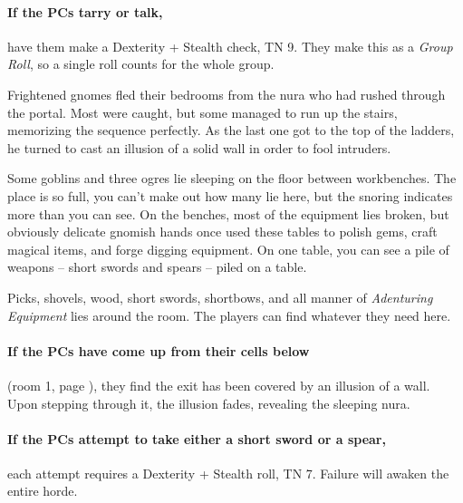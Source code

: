 \begin{multicols}{2}
\paragraph{If the PCs tarry or talk,}
have them make a Dexterity + Stealth check, TN 9.
They make this as a \textit{Group Roll}, so a single roll counts for the whole group.


\label{laddertop}

\begin{exampletext}

	Frightened gnomes fled their bedrooms from the nura who had rushed through the portal.
	Most were caught, but some managed to run up the stairs, memorizing the sequence perfectly.
	As the last one got to the top of the ladders, he turned to cast an illusion of a solid wall in order to fool intruders.

\end{exampletext}

\begin{boxtext}

	Some goblins and three ogres lie sleeping on the floor between workbenches.
	The place is so full, you can't make out how many lie here, but the snoring indicates more than you can see.
	On the benches, most of the equipment lies broken, but obviously delicate gnomish hands once used these tables to polish gems, craft magical items, and forge digging equipment.
	On one table, you can see a pile of weapons -- short swords and spears -- piled on a table.

\end{boxtext}

Picks, shovels, wood, short swords, shortbows, and all manner of \textit{Adenturing Equipment} lies around the room.
The players can find whatever they need here.

\paragraph{If the PCs have come up from their cells below}
(room 1, page \pageref{entrycell}), they find the exit has been covered by an illusion of a wall.
Upon stepping through it, the illusion fades, revealing the sleeping nura.

\paragraph{If the PCs attempt to take either a short sword or a spear,}
each attempt requires a Dexterity + Stealth roll, TN 7.
Failure will awaken the entire horde.


\end{multicols}
